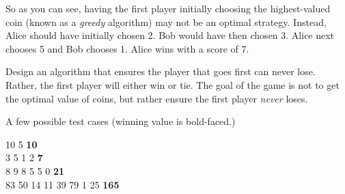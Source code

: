 \documentclass[11pt]{article}
\begin{document}
So as you can see, having the first player initially choosing the highest-valued coin (known as a {\it greedy} algorithm) may not be an optimal strategy.  Instead, Alice should have initially chosen 2. Bob would have then chosen 3. Alice next chooses 5 and Bob chooses 1. Alice wins with a score of 7.

Design an algorithm that ensures the player that goes first can never lose. Rather, the first player will either win or tie. The goal of the game is not to get the optimal value of coins, but rather ensure the first player {\it never} loses. 

A few possible test cases (winning value is bold-faced.) 

10 5 {\bf 10} \\
3 5 1 2 {\bf 7} \\
8 9 8 5 5 0 {\bf 21} \\
83 50 14 11 39 79 1 25 {\bf 165}

 
\end{document}
